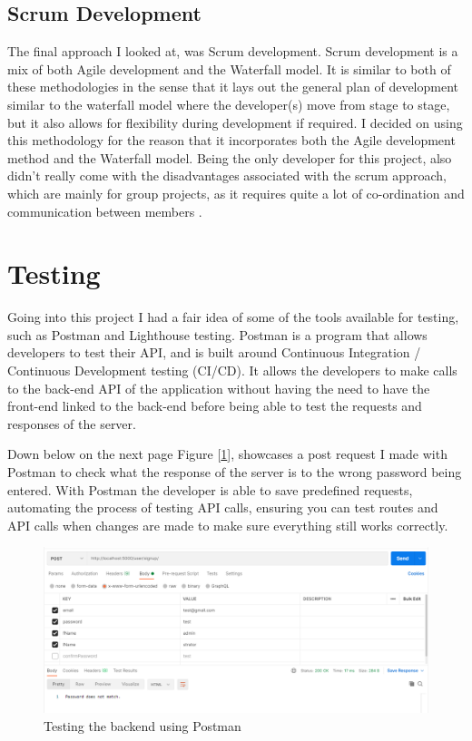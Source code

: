 \subsection{Scrum Development}
The final approach I looked at, was Scrum development. Scrum development is a mix of both Agile development and the Waterfall model. It is similar to both of these methodologies in the sense that it lays out the general plan of development similar to the waterfall model where the developer(s) move from stage to stage, but it also allows for flexibility during development if required. I decided on using this methodology for the reason that it incorporates both the Agile development method and the Waterfall model. Being the only developer for this project, also didn't really come with the disadvantages associated with the scrum approach, which are mainly for group projects, as it requires quite a lot of co-ordination and communication between members \cite{scrum}.

\section{Testing}Going into this project I had a fair idea of some of the tools available for testing, such as Postman and Lighthouse testing. Postman is a program that allows developers to test their API, and is built around Continuous Integration / Continuous Development testing (CI/CD). It allows the developers to make calls to the back-end API of the application without having the need to have the front-end linked to the back-end before being able to test the requests and responses of the server. 

Down below on the next page Figure [\ref{fig1:post1}], showcases a post request I made with Postman to check what the response of the server is to the wrong password being entered. With Postman the developer is able to save predefined requests, automating the process of testing API calls, ensuring you can test routes and API calls when changes are made to make sure everything still works correctly.

\begin{figure}
    \centering
    \includegraphics[scale=0.45]{img/test-make-user-wrong-pass.png}
    \caption{Testing the backend using Postman}
    \label{fig1:post1}
\end{figure}


